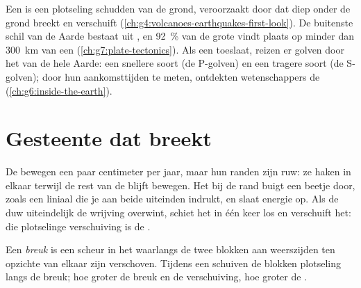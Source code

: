 \begin{recall}
Een \emph{} is een plotseling schudden van de grond, veroorzaakt
door  dat diep onder de grond breekt en verschuift
(\cref{ch:g4:volcanoes-earthquakes-first-look}). De buitenste schil van de
Aarde bestaat uit , en 92~\% van de grote  vindt plaats
op minder dan \qty{300}{km} van een 
(\cref{ch:g7:plate-tectonics}). Als een  toeslaat, reizen er
golven door het  van de hele Aarde: een snellere soort (de
P-golven) en een tragere soort (de S-golven); door hun aankomsttijden te
meten, ontdekten wetenschappers de  (\cref{ch:g6:inside-the-earth}).
\end{recall}

\section{Gesteente dat breekt}

De  bewegen een paar centimeter per jaar, maar hun randen zijn ruw:
ze haken in elkaar terwijl de rest van de  blijft bewegen. Het
 bij de rand buigt een beetje door, zoals een liniaal die je aan
beide uiteinden indrukt, en slaat energie op. Als de duw uiteindelijk de
wrijving overwint, schiet het  in één keer los en verschuift het:
die plotselinge verschuiving is de .

\begin{definition}[Breuk]\label{def:g7:earthquakes:fault}
Een \emph{breuk} is een scheur in het  waarlangs de
twee blokken aan weerszijden ten opzichte van elkaar zijn verschoven.
Tijdens een  schuiven de blokken plotseling langs de breuk; hoe
groter de breuk en de verschuiving, hoe groter de .
\end{definition}

